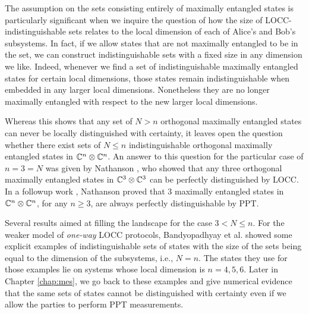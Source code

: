The assumption on the sets consisting entirely of maximally entangled states is
particularly significant when we inquire the question of how the size of LOCC-indistinguishable 
sets relates to the local dimension of each of Alice's and Bob's subsystems. 
In fact, if we allow states that are not maximally entangled to be in the set,
we can construct indistinguishable sets with a fixed size in any dimension we like.
Indeed, whenever we find a set of indistinguishable maximally entangled states 
for certain local dimensions, those states remain indistinguishable when embedded 
in any larger local dimensions. Nonetheless they are no longer maximally 
entangled with respect to the new larger local dimensions.

Whereas this shows that any set of $N > n$ orthogonal maximally entangled states 
can never be locally distinguished with certainty, it leaves open the question 
whether there exist sets of $N \leq n$ indistinguishable orthogonal maximally 
entangled states in $\mathbb{C}^{n}\otimes\mathbb{C}^{n}$.
An answer to this question for the particular case of $n = 3 = N$ was given by 
Nathanson \cite{Nathanson05}, who showed that any three orthogonal maximally 
entangled states in $\mathbb{C}^{3}\otimes\mathbb{C}^{3}$ can be perfectly 
distinguished by LOCC. In a followup work \cite{Nathanson13}, 
Nathanson proved that $3$ maximally entangled states 
in $\mathbb{C}^{n}\otimes\mathbb{C}^{n}$, for any $n \geq 3$, are always perfectly
distinguishable by PPT.

Several results aimed at filling the landscape for the case $3 < N \leq n$.
For the weaker model of \emph{one-way} LOCC protocols, 
Bandyopadhyay et al. \cite{Bandyopadhyay11a} showed some explicit examples of 
indistinguishable sets of states with the size of the sets being equal to the 
dimension of the subsystems, i.e., $N = n$. The states they use for those 
examples lie on systems whose local dimension is $n = 4, 5, 6$. 
Later in Chapter \ref{chap:mes}, we go back to these examples and give
numerical evidence that the same sets of states cannot be distinguished with 
certainty even if we allow the parties to perform PPT measurements. 

